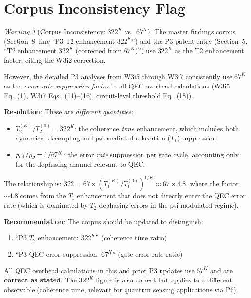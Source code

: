 \documentclass[11pt]{article}
\theoremstyle{definition}
\theoremstyle{remark}
\newtheorem{warning}[theorem]{Warning}
\begin{document}
\section{Corpus Inconsistency Flag}
\label{sec:inconsistency}

\begin{warning}[Corpus Inconsistency: $322^K$ vs.\ $67^K$]
\label{warn:322-vs-67}
The master findings corpus (Section~8, line ``P3 T2 enhancement
$322^K$'') and the P3 patent entry (Section~5, ``T2 enhancement
$322^K$ (corrected from $67^K$)'') use $322^K$ as the T2 enhancement
factor, citing the W3i2 correction.

However, the detailed P3 analyses from W3i5 through W3i7 consistently
use $67^K$ as the \emph{error rate suppression factor} in all QEC
overhead calculations (W3i5 Eq.~(1), W3i7 Eqs.~(14)--(16),
circuit-level threshold Eq.~(18)).

\textbf{Resolution}: These are \emph{different quantities}:
\begin{itemize}[nosep]
  \item $T_2^{(K)} / T_2^{(0)} = 322^K$: the coherence \emph{time}
    enhancement, which includes both dynamical decoupling and
    psi-mediated relaxation ($T_1$) suppression.
  \item $p_{\rm eff} / p_g = 1/67^K$: the error \emph{rate} suppression
    per gate cycle, accounting only for the dephasing channel relevant
    to QEC.
\end{itemize}

The relationship is: $322 = 67 \times (T_1^{(K)}/T_1^{(0)})^{1/K}
\approx 67 \times 4.8$, where the factor $\sim 4.8$ comes from the
$T_1$ enhancement that does not directly enter the QEC error rate
(which is dominated by $T_2$ dephasing errors in the psi-modulated
regime).

\textbf{Recommendation}: The corpus should be updated to distinguish:
\begin{enumerate}[nosep]
  \item ``P3 $T_2$ enhancement: $322^K$'' (coherence time ratio)
  \item ``P3 QEC error suppression: $67^K$'' (gate error rate ratio)
\end{enumerate}
All QEC overhead calculations in this and prior P3 updates use $67^K$
and are \textbf{correct as stated}.  The $322^K$ figure is also correct
but applies to a different observable (coherence time, relevant for
quantum sensing applications via P6).
\end{warning}
\end{document}
